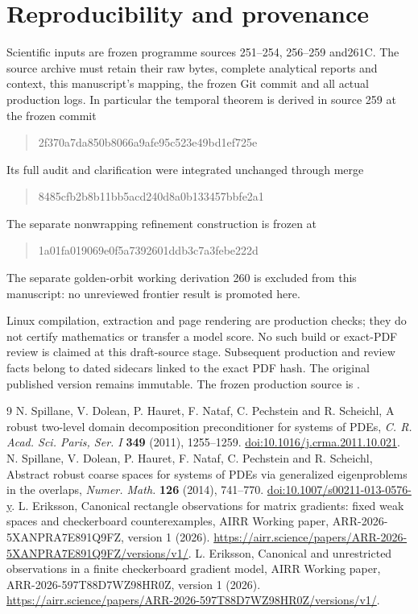 \documentclass[11pt,a4paper]{article}
\providecommand{\SourceCommit}{\errmessage{A frozen SourceCommit must be supplied}}
\begin{document}
\section*{Reproducibility and provenance}
Scientific inputs are frozen programme sources 251--254, 256--259 and261C.
The source archive must retain their raw bytes, complete analytical reports
and context, this manuscript's mapping, the frozen Git commit and all actual
production logs. In particular the temporal theorem is derived in source 259
at the frozen commit
\begin{quote}\small\ttfamily 2f370a7da850b8066a9afe95c523e49bd1ef725e\end{quote}
Its full audit and clarification were integrated unchanged through merge
\begin{quote}\small\ttfamily 8485cfb2b8b11bb5acd240d8a0b133457bbfe2a1\end{quote}
The separate nonwrapping refinement construction is frozen at
\begin{quote}\small\ttfamily 1a01fa019069e0f5a7392601ddb3c7a3febe222d\end{quote}
The separate golden-orbit working derivation 260 is excluded from this
manuscript: no unreviewed frontier result is promoted here.

Linux compilation, extraction and page rendering are production checks;
they do not certify mathematics or transfer a model score. No such build
or exact-PDF review is claimed at this draft-source stage. Subsequent
production and review facts belong to dated sidecars linked to the exact
PDF hash. The original published version remains immutable. The frozen
production source is \texttt{\SourceCommit}.

\begingroup
\small
\begin{thebibliography}{9}
\setlength{\itemsep}{3pt}
N. Spillane, V. Dolean, P. Hauret, F. Nataf, C. Pechstein and R. Scheichl,
A robust two-level domain decomposition preconditioner for systems of PDEs,
\emph{C. R. Acad. Sci. Paris, Ser. I} \textbf{349} (2011), 1255--1259.
\href{https://doi.org/10.1016/j.crma.2011.10.021}{doi:10.1016/j.crma.2011.10.021}.
N. Spillane, V. Dolean, P. Hauret, F. Nataf, C. Pechstein and R. Scheichl,
Abstract robust coarse spaces for systems of PDEs via generalized eigenproblems
in the overlaps, \emph{Numer. Math.} \textbf{126} (2014), 741--770.
\href{https://doi.org/10.1007/s00211-013-0576-y}{doi:10.1007/s00211-013-0576-y}.
L. Eriksson, Canonical rectangle observations for matrix gradients: fixed weak
spaces and checkerboard counterexamples, AIRR Working paper,
ARR-2026-5XANPRA7E891Q9FZ, version 1 (2026).
\url{https://airr.science/papers/ARR-2026-5XANPRA7E891Q9FZ/versions/v1/}.
L. Eriksson, Canonical and unrestricted observations in a finite checkerboard
gradient model, AIRR Working paper, ARR-2026-597T88D7WZ98HR0Z,
version 1 (2026).
\url{https://airr.science/papers/ARR-2026-597T88D7WZ98HR0Z/versions/v1/}.
\end{thebibliography}
\endgroup
\end{document}
